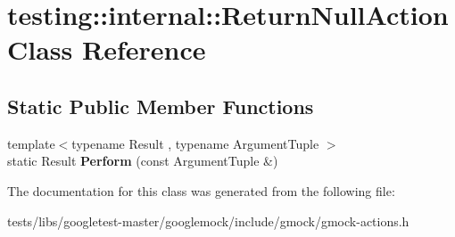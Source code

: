 \hypertarget{classtesting_1_1internal_1_1ReturnNullAction}{}\section{testing\+:\+:internal\+:\+:Return\+Null\+Action Class Reference}
\label{classtesting_1_1internal_1_1ReturnNullAction}
\subsection*{Static Public Member Functions}
\begin{DoxyCompactItemize}
\item 
\mbox{\label{classtesting_1_1internal_1_1ReturnNullAction_a6ce1fba236686df93070320b399e4f32}} 
{\footnotesize template$<$typename Result , typename Argument\+Tuple $>$ }\\static Result {\bfseries Perform} (const Argument\+Tuple \&)
\end{DoxyCompactItemize}


The documentation for this class was generated from the following file\+:\begin{DoxyCompactItemize}
\item 
tests/libs/googletest-\/master/googlemock/include/gmock/gmock-\/actions.\+h\end{DoxyCompactItemize}
